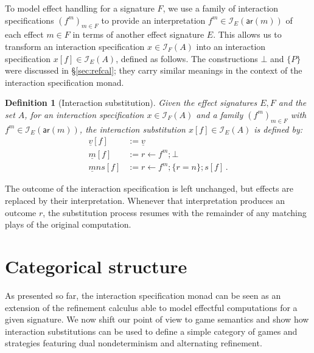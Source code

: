 \documentclass[draft,11pt]{report}
\newtheorem{definition}{Definition}
\newcommand{\kw}[1]{\ensuremath{ \mathsf{#1} }}
\begin{document}
To model effect handling for a signature $F$,
we use a family of interaction specifications
$(f^m)_{m \in F}$
to provide an interpretation $f^m \in \mathcal{I}_E(\kw{ar}(m))$
of each effect $m \in F$
in terms of another effect signature $E$.
This allows us to transform an interaction specification
$x \in \mathcal{I}_F(A)$
into an interaction specification
$x[f] \in \mathcal{I}_E(A)$,
defined as follows.
The constructions $\bot$ and $\{P\}$ were discussed in \S\ref{sec:refcal};
they carry similar meanings in the context of the
interaction specification monad.

\begin{definition}[Interaction substitution]
Given the effect signatures $E, F$ and the set $A$,
for an interaction specification $x \in \mathcal{I}_F(A)$
and a family $(f^m)_{m \in F}$ with $f^m \in \mathcal{I}_E(\kw{ar}(m))$,
the \emph{interaction substitution} $x[f] \in \mathcal{I}_E(A)$
is defined by:
\begin{align*}
  \underline{v}[f] &:= \underline{v} \\
  \underline{m}[f] &:= r \leftarrow f^m ; \bot \\
  \underline{m}ns[f] &:= r \leftarrow f^m ; \{r = n\} ; s[f] \,.
\end{align*}
\end{definition}


The outcome of the interaction specification is left unchanged,
but effects are replaced by their interpretation.
Whenever that interpretation produces an outcome $r$,
the substitution process resumes with the remainder of any
matching plays of the original computation.


\section{Categorical structure} \label{sec:intm:cat} %

As presented so far,
the interaction specification monad
can be seen as an extension of the refinement calculus
able to model effectful computations
for a given signature.
We now shift our point of view to game semantics
and show how interaction substitutions
can be used to define a simple category of games and strategies
featuring dual nondeterminism and alternating refinement.
\end{document}
